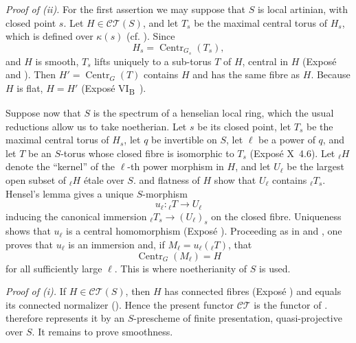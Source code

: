 
\medskip\noindent\textit{Proof of (ii).}
For the first assertion we may suppose that \(S\) is local artinian,
with closed point \(s\). Let \(H\in\mathcal{CT}(S)\), and let \(T_s\)
be the maximal central torus of \(H_s\), which is defined over
\(\kappa(s)\) (cf. ). Since
\[
  H_s=\operatorname{Centr}_{G_s}(T_s),
\]
and \(H\) is smooth, \(T_s\) lifts uniquely to a sub-torus \(T\) of
\(H\), central in \(H\) (Exposé  and ). Then
\(H'=\operatorname{Centr}_G(T)\) contains \(H\) and has the same
fibre as \(H\). Because \(H\) is flat, \(H=H'\) (Exposé
VI\textsubscript{B}~).

Suppose now that \(S\) is the spectrum of a henselian local ring,
which the usual reductions allow us to take noetherian. Let \(s\) be
its closed point, let \(T_s\) be the maximal central torus of \(H_s\),
let \(q\) be invertible on \(S\), let \(\ell\) be a power of \(q\),
and let \(T\) be an \(S\)-torus whose closed fibre is isomorphic to
\(T_s\) (Exposé X~4.6). Let \({}_\ell H\) denote the ``kernel'' of
the \(\ell\)-th power morphism in \(H\), and let \(U_\ell\) be the
largest open subset of \({}_\ell H\) étale over \(S\).  and
flatness of \(H\) show that \(U_\ell\) contains \({}_\ell T_s\).
Hensel's lemma gives a unique \(S\)-morphism
\[
  u_\ell:{}_\ell T\longrightarrow U_\ell
\]
inducing the canonical immersion
\({}_\ell T_s\to(U_\ell)_s\) on the closed fibre. Uniqueness shows
that \(u_\ell\) is a central homomorphism (Exposé ).
Proceeding as in  and , one proves that \(u_\ell\) is an
immersion and, if \(M_\ell=u_\ell({}_\ell T)\), that
\[
  \operatorname{Centr}_G(M_\ell)=H
\]
for all sufficiently large \(\ell\). This is where noetherianity of
\(S\) is used.

\medskip\noindent\textit{Proof of (i).}
If \(H\in\mathcal{CT}(S)\), then \(H\) has connected fibres (Exposé
) and equals its connected normalizer (). Hence the
present functor \(\mathcal{CT}\) is the functor of . 
therefore represents it by an \(S\)-prescheme of finite presentation,
quasi-projective over \(S\). It remains to prove smoothness.

